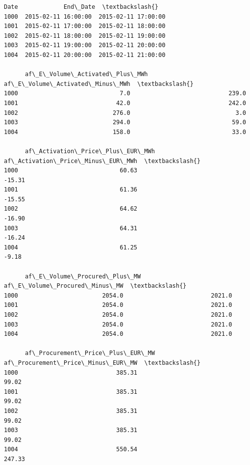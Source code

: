 \documentclass[a4paper]{article}
\makeatletter
\newcommand{\boxspacing}{\kern\kvtcb@left@rule\kern\kvtcb@boxsep}
\newcommand{\prompt}[4]{
        {\ttfamily\llap{{\color{#2}[#3]:\hspace{3pt}#4}}\vspace{-\baselineskip}}
    }
\makeatother
\begin{document}
            \begin{tcolorbox}[breakable, size=fbox, boxrule=.5pt, pad at break*=1mm, opacityfill=0]
\prompt{Out}{outcolor}{2}{\boxspacing}
\begin{small}
\begin{Verbatim}[commandchars=\\\{\}]
                     Date             End\_Date  \textbackslash{}
1000  2015-02-11 16:00:00  2015-02-11 17:00:00
1001  2015-02-11 17:00:00  2015-02-11 18:00:00
1002  2015-02-11 18:00:00  2015-02-11 19:00:00
1003  2015-02-11 19:00:00  2015-02-11 20:00:00
1004  2015-02-11 20:00:00  2015-02-11 21:00:00

      af\_E\_Volume\_Activated\_Plus\_MWh  af\_E\_Volume\_Activated\_Minus\_MWh  \textbackslash{}
1000                             7.0                            239.0
1001                            42.0                            242.0
1002                           276.0                              3.0
1003                           294.0                             59.0
1004                           158.0                             33.0

      af\_Activation\_Price\_Plus\_EUR\_MWh  af\_Activation\_Price\_Minus\_EUR\_MWh  \textbackslash{}
1000                             60.63                             -15.31
1001                             61.36                             -15.55
1002                             64.62                             -16.90
1003                             64.31                             -16.24
1004                             61.25                              -9.18

      af\_E\_Volume\_Procured\_Plus\_MW  af\_E\_Volume\_Procured\_Minus\_MW  \textbackslash{}
1000                        2054.0                         2021.0
1001                        2054.0                         2021.0
1002                        2054.0                         2021.0
1003                        2054.0                         2021.0
1004                        2054.0                         2021.0

      af\_Procurement\_Price\_Plus\_EUR\_MW  af\_Procurement\_Price\_Minus\_EUR\_MW  \textbackslash{}
1000                            385.31                              99.02
1001                            385.31                              99.02
1002                            385.31                              99.02
1003                            385.31                              99.02
1004                            550.54                             247.33


\end{Verbatim}
\end{small}
\end{tcolorbox}
\end{document}
